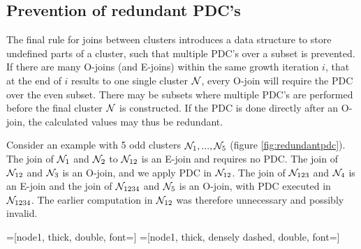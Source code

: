 \subsection{Prevention of redundant PDC's}\label{sec:multiplejoint}
The final rule for joins between clusters introduces a data structure to store undefined parts of a cluster, such that multiple PDC's over a subset is prevented. If there are many O-joins (and E-joins) within the same growth iteration $i$, that at the end of $i$ results to one single cluster $\mathcal{N}$, every O-join will require the PDC over the even subset. There may be subsets where multiple PDC's are performed before the final cluster $\mathcal{N}$ is constructed. If the PDC is done directly after an O-join, the calculated values may thus be redundant.

Consider an example with 5 odd clusters $\mathcal{N}_1, ...,  \mathcal{N}_5$ (figure \ref{fig:redundantpdc}). The join of $\mathcal{N}_1$ and $\mathcal{N}_2$ to $\mathcal{N}_{12}$ is an E-join and requires no PDC. The join of $\mathcal{N}_{12}$ and $\mathcal{N}_3$ is an O-join, and we apply PDC in $\mathcal{N}_{12}$. The join of $\mathcal{N}_{123}$ and $\mathcal{N}_4$ is an E-join and the join of $\mathcal{N}_{1234}$ and $\mathcal{N}_5$ is an O-join, with PDC executed in $\mathcal{N}_{1234}$. The earlier computation in $\mathcal{N}_{12}$ was therefore unnecessary and possibly invalid.

=[node1, thick, double, font=\footnotesize]
=[node1, thick, densely dashed, double, font=\footnotesize]

